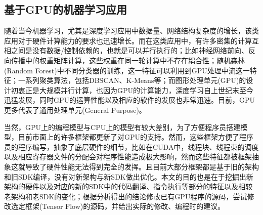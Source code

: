 \subsection{基于GPU的机器学习应用}
\par 随着当今机器学习，尤其是深度学习应用中数据量、网络结构复杂度的增长，该类应用对于硬件计算能力的要求也迅速增长。而在这类应用中，有许多密集的计算互相之间是没有数据/控制依赖的，也就是可以并行执行的；比如神经网络前向、反向传播中的权重矩阵计算，这些权重在同一轮计算中不存在耦合性；随机森林(Random Forest)中不同分类器的训练，这一特征可以利用到GPU处理中流这一特征；一系列聚类算法，包括DBSCAN、K-Means等；而图形处理单元(GPU)的设计初衷正是大规模并行计算，也因为GPU的计算能力，深度学习自上世纪末至今迅猛发展，同时GPU的运算性能以及相应的软件的发展也非常迅速。目前，GPU更多代表了通用处理单元(General Purpose)。
\par 当然，GPU上的编程模型与CPU上的模型有较大差别，为了方便程序员搭建模型，目前市面上的许多框架都更新了对GPU的支持。然而，这些框架方便了程序员的程序编写，抽象了底层硬件的细节，比如在CUDA中，线程块、线程束的调度以及相应寄存器文件的分配会对程序性能造成极大影响，然而这些特征都被框架抽象这就导致了硬件性能无法得到完全的发挥。且目前大部分框架都是基于旧的架构和旧SDK编译，没有对新架构与新SDK做出优化。本文的目的也是在于挖掘出新架构的硬件以及对应的新的SDK中的代码翻译、指令执行等部分的特征以及相较老架构和老SDK的变化；根据分析得出的结论修改已有GPU程序的源码，尝试修改选定框架(Tensor Flow)的源码，并给出实际的修改、编程时的建议。

